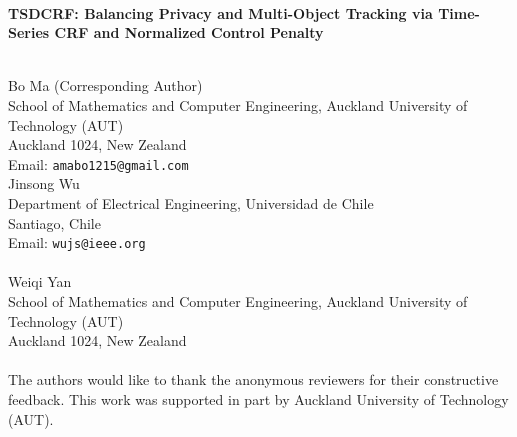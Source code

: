 \clearpage
\thispagestyle{empty}

\\[0.5em]
\begin{center}
{\LARGE \bfseries TSDCRF: Balancing Privacy and Multi-Object Tracking via Time-Series CRF and Normalized Control Penalty \par}
\vspace{1.5em}
\end{center}

\\[0.5em]
\noindent Bo Ma (Corresponding Author)\\
School of Mathematics and Computer Engineering, Auckland University of Technology (AUT)\\
Auckland 1024, New Zealand\\
Email: \texttt{amabo1215@gmail.com}\\[0.75em]

\noindent Jinsong Wu\\
Department of Electrical Engineering, Universidad de Chile\\
Santiago, Chile\\
Email: \texttt{wujs@ieee.org}\\[1.0em]

\\[0.5em]
\noindent Weiqi Yan \\
School of Mathematics and Computer Engineering, Auckland University of Technology (AUT)\\
Auckland 1024, New Zealand\\

\\[0.5em]
\noindent The authors would like to thank the anonymous reviewers for their constructive feedback.
This work was supported in part by Auckland University of Technology (AUT).

\clearpage